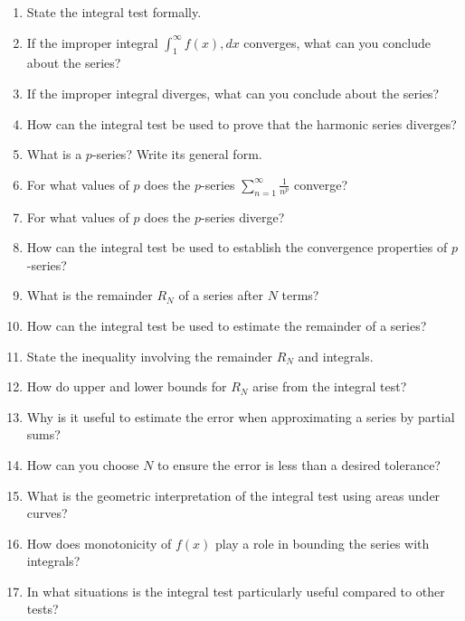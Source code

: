 \begin{enumerate}
\item State the integral test formally.

\item If the improper integral $\int_1^\infty f(x),dx$ converges, what can you conclude about the series?

\item If the improper integral diverges, what can you conclude about the series?

\item How can the integral test be used to prove that the harmonic series diverges?

\item What is a $p$-series? Write its general form.

\item For what values of $p$ does the $p$-series $\sum_{n=1}^{\infty} \frac{1}{n^p}$ converge?

\item For what values of $p$ does the $p$-series diverge?

\item How can the integral test be used to establish the convergence properties of $p$-series?

\item What is the remainder $R_N$ of a series after $N$ terms?

\item How can the integral test be used to estimate the remainder of a series?

\item State the inequality involving the remainder $R_N$ and integrals.

\item How do upper and lower bounds for $R_N$ arise from the integral test?

\item Why is it useful to estimate the error when approximating a series by partial sums?

\item How can you choose $N$ to ensure the error is less than a desired tolerance?

\item What is the geometric interpretation of the integral test using areas under curves?

\item How does monotonicity of $f(x)$ play a role in bounding the series with integrals?

\item In what situations is the integral test particularly useful compared to other tests?

\end{enumerate}
